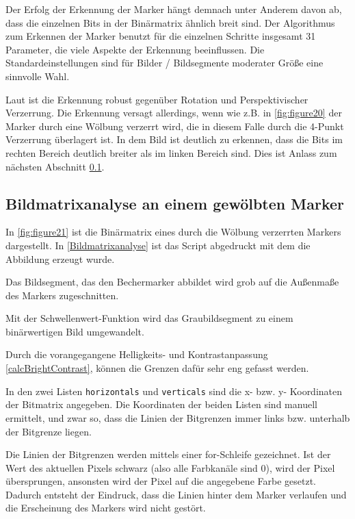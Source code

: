     Der Erfolg der Erkennung der Marker hängt demnach unter Anderem davon ab, dass die einzelnen Bits in der Binärmatrix ähnlich breit sind. 
    Der Algorithmus zum Erkennen der Marker benutzt für die einzelnen Schritte insgesamt 31 Parameter, die viele Aspekte der Erkennung beeinflussen.
    Die Standardeinstellungen sind für Bilder / Bildsegmente moderater Größe eine sinnvolle Wahl. 
    
    Laut \cite[OpenCV]{OpenCVaruco} ist die Erkennung robust gegenüber Rotation und Perspektivischer Verzerrung. 
    Die Erkennung versagt allerdings, wenn wie z.B. in \ref{fig:figure20} der Marker durch eine Wölbung verzerrt wird, die in diesem Falle durch die 4-Punkt Verzerrung überlagert ist.
    In dem Bild ist deutlich zu erkennen, dass die Bits im rechten Bereich deutlich breiter als im linken Bereich sind. 
    Dies ist Anlass zum nächsten Abschnitt \ref{ChapBildmatrixanalyse}.

    \subsection{Bildmatrixanalyse an einem gewölbten Marker}\label{ChapBildmatrixanalyse}

    In \ref{fig:figure21} ist die Binärmatrix eines durch die Wölbung verzerrten Markers dargestellt. 
    In \ref{Bildmatrixanalyse} ist das Script abgedruckt mit dem die Abbildung erzeugt wurde.

    Das Bildsegment, das den Bechermarker abbildet wird grob auf die Außenmaße des Markers zugeschnitten.

    Mit der Schwellenwert-Funktion wird das Graubildsegment zu einem binärwertigen Bild umgewandelt.

    Durch die vorangegangene Helligkeits- und Kontrastanpassung \ref{calcBrightContrast}, können die Grenzen dafür sehr eng gefasst werden.
    
    In den zwei Listen \verb|horizontals| und \verb|verticals| sind die x- bzw. y- Koordinaten der Bitmatrix angegeben. 
    Die Koordinaten der beiden Listen sind manuell ermittelt, und zwar so, dass die Linien der Bitgrenzen immer links bzw. unterhalb der Bitgrenze liegen.

    Die Linien der Bitgrenzen werden mittels einer for-Schleife gezeichnet. 
    Ist der Wert des aktuellen Pixels schwarz (also alle Farbkanäle sind 0), wird der Pixel übersprungen, ansonsten wird der Pixel auf die angegebene Farbe gesetzt. 
    Dadurch entsteht der Eindruck, dass die Linien hinter dem Marker verlaufen und die Erscheinung des Markers wird nicht gestört. 
    
